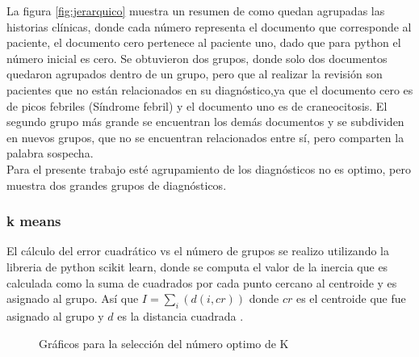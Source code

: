 La figura \ref{fig:jerarquico} muestra un resumen de como quedan agrupadas las historias clínicas, donde cada número representa el documento que corresponde al paciente, el documento cero pertenece al paciente uno, dado que para python el número inicial es cero. Se obtuvieron dos grupos, donde solo dos documentos quedaron agrupados dentro de un grupo, pero que al realizar la revisión son pacientes que no están relacionados en su diagnóstico,ya que el documento cero es de picos febriles (Síndrome febril) y el documento uno es de craneocitosis. El segundo grupo más grande se encuentran los demás documentos y se subdividen en nuevos grupos, que no se encuentran relacionados entre sí, pero comparten la palabra sospecha.\\

Para el presente trabajo esté agrupamiento de los diagnósticos no es optimo, pero muestra dos grandes grupos de diagnósticos. 

\subsubsection{k means}

El cálculo del error cuadrático vs el número de grupos se realizo utilizando la libreria de python scikit learn, donde se computa el valor de la inercia que es calculada como la suma de cuadrados por cada punto cercano al centroide y es asignado al grupo. Así que  $I = \sum_{i}(d(i,cr))$ donde $cr$ es el centroide que fue asignado al grupo y $d$ es la distancia cuadrada \cite{scikit-learn}. 

\begin{figure}[H]
	\centering
	\caption{Gráficos para la selección del número optimo de K}
	\label{f:medidas}
\end{figure}


